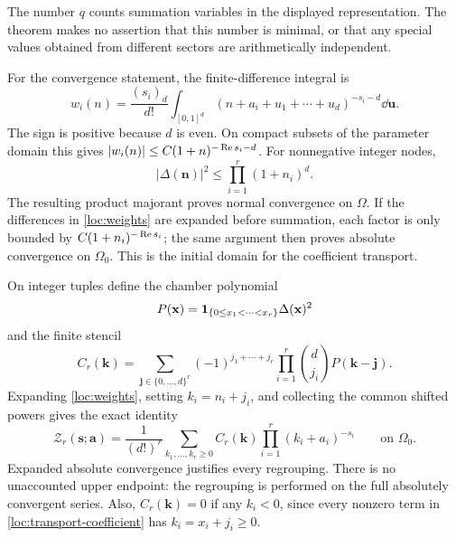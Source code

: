 The number $q$ counts summation variables in the displayed representation.
The theorem makes no assertion that this number is minimal, or that any
special values obtained from different sectors are arithmetically
independent.

For the convergence statement, the finite-difference integral is
\begin{equation}
 w_i(n)=\frac{(s_i)_d}{d!}
       \int_{[0,1]^d}
       (n+a_i+u_1+\cdots+u_d)^{-s_i-d}\dd\mathbf u.
 \label{loc:difference-integral}
\end{equation}
The sign is positive because $d$ is even.  On compact subsets of the
parameter domain this gives
$|w_i(n)|\le C(1+n)^{-\operatorname{Re} s_i-d}$.  For nonnegative integer nodes,
\begin{equation}
 |\Delta(\mathbf n)|^2\le\prod_{i=1}^r(1+n_i)^d.
 \label{loc:vandermonde-bound}
\end{equation}
The resulting product majorant proves normal convergence on $\Omega$.
If the differences in \eqref{loc:weights} are expanded before summation,
each factor is only bounded by $C(1+n_i)^{-\operatorname{Re} s_i}$; the same argument
then proves absolute convergence on $\Omega_0$.  This is the initial
domain for the coefficient transport.

On integer tuples define the chamber polynomial
\begin{equation}
 P(\mathbf x)=\mathbf 1_{\{0\le x_1<\cdots<x_r\}}
                                      \Delta(\mathbf x)^2
 \label{loc:chamber}
\end{equation}
and the finite stencil
\begin{equation}
 C_r(\mathbf k)=
 \sum_{\mathbf j\in\{0,\ldots,d\}^r}
       (-1)^{j_1+\cdots+j_r}\prod_{i=1}^r\binom d{j_i}
       P(\mathbf k-\mathbf j).
 \label{loc:transport-coefficient}
\end{equation}
Expanding \eqref{loc:weights}, setting $k_i=n_i+j_i$, and collecting the
common shifted powers gives the exact identity
\begin{equation}
 \mathcal Z_r(\mathbf s;\mathbf a)
 =\frac1{(d!)^r}\sum_{k_1,\ldots,k_r\ge0}
               C_r(\mathbf k)\prod_{i=1}^r(k_i+a_i)^{-s_i}
 \qquad\text{on }\Omega_0.
 \label{loc:transport}
\end{equation}
Expanded absolute convergence justifies every regrouping.  There is no
unaccounted upper endpoint: the regrouping is performed on the full
absolutely convergent series.  Also, $C_r(\mathbf k)=0$ if any $k_i<0$,
since every nonzero term in \eqref{loc:transport-coefficient} has
$k_i=x_i+j_i\ge0$.

